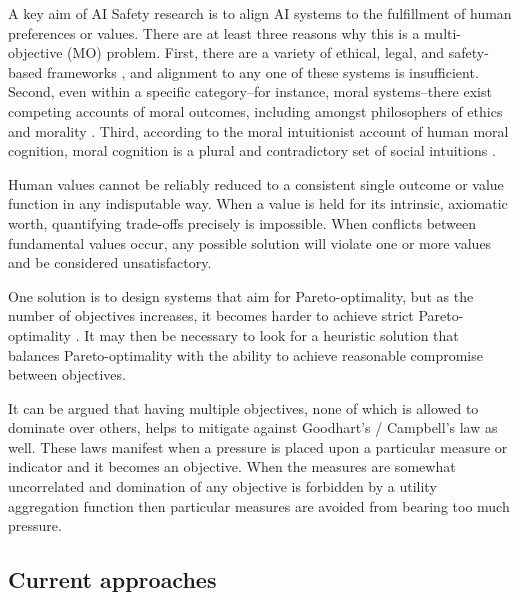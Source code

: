 

A key aim of AI Safety research is to align AI systems to the fulfillment of human preferences \cite{Bostrom2014, russell2019human} or values. There are at least three reasons why this is a multi-objective (MO) problem. First, there are a variety of ethical, legal, and safety-based frameworks \cite{vamplew_human-aligned_2018}, and alignment to any one of these systems is insufficient. Second, even within a specific category--for instance, moral systems--there exist competing accounts of moral outcomes, including amongst philosophers of ethics and morality \cite{bogosian_implementation_2017}. Third, according to the moral intuitionist account of human moral cognition, moral cognition is a plural and contradictory set of social intuitions \cite{haidt2001emotional,sotala2016defining}.

Human values cannot be reliably reduced to a consistent single outcome or value function in any indisputable way. When a value is held for its intrinsic, axiomatic worth, quantifying trade-offs precisely is impossible. When conflicts between fundamental values occur, any possible solution will violate one or more values and be considered unsatisfactory.  

One solution is to design systems that aim for Pareto-optimality, but as the number of objectives increases, it becomes harder to achieve strict Pareto-optimality \cite{rolf_need_2020}. It may then be necessary to look for a heuristic solution that balances Pareto-optimality with the ability to achieve reasonable compromise between objectives. %

It can be argued that having multiple objectives, none of which is allowed to dominate over others, helps to mitigate against Goodhart's / Campbell's law as well. These laws manifest when a pressure is placed upon a particular measure or indicator and it becomes an objective. When the measures are somewhat uncorrelated and domination of any objective is forbidden by a utility aggregation function then particular measures are avoided from bearing too much pressure.

\subsection{Current approaches}

